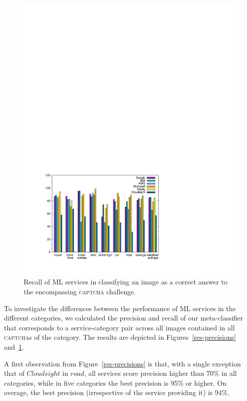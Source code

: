 \documentclass[sigconf,review,anonymous]{acmart}
\newcommand{\captcha}{\textsc{captcha}\xspace}
\newcommand{\captchas}{\textsc{captcha}s\xspace}
\begin{document}
\begin{figure}[t]
\centering
\includegraphics[width=\columnwidth]{images/recalls-1.pdf}
\caption{Recall of ML services in classifying an image as a correct answer to the encompassing \captcha challenge.}
\label{res-recalls}
\end{figure}

To investigate the differences between the performance of ML services in the different categories, we calculated the precision and recall of our meta-classifier that corresponds to a service-category pair across all images contained in all \captchas of the category. The results are depicted in Figures~\ref{res-precisions} and~\ref{res-recalls}. 

A first observation from Figure~\ref{res-precisions} is that, with a single exception that of $Cloudsight$ in $road$, all services score precision higher than 70\% in all categories, while in five categories the best precision is 95\% or higher. On average, the best precision (irrespective of the service providing it) is 94\%. 
\end{document}
